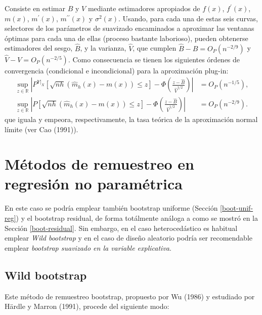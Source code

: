 \documentclass[
]{book}
\theoremstyle{break}
\theoremstyle{nonumberplain}
\begin{document}
Consiste en estimar \(B\) y \(V\) mediante estimadores apropiados de
\(f\left(x \right)\), \(f^{\prime}\left( x \right)\), \(m\left( x \right)\),
\(m^{\prime}\left( x \right)\), \(m^{\prime \prime }\left( x \right)\) y
\(\sigma^2\left( x \right)\). Usando, para cada una de estas seis curvas,
selectores de los parámetros de suavizado encaminados a aproximar las
ventanas óptimas para cada una de ellas (proceso bastante laborioso),
pueden obtenerse estimadores del sesgo, \(\hat{B}\), y la varianza,
\(\hat{V}\), que cumplen \(\hat{B}-B=O_{P}\left( n^{-2/9} \right)\) y
\(\hat{V}-V=O_{P}\left( n^{-2/5} \right)\).
Como consecuencia se tienen los siguientes órdenes de convergencia
(condicional e incondicional) para la aproximación plug-in:
\[\begin{aligned}
\sup_{z\in \mathbb{R}}\left\vert P^{\left. Y\right\vert _{X}}\left[ 
\sqrt{nh}\left( \hat{m}_{h}\left( x \right) -m\left( x \right) \right) \leq z
\right] -\Phi \left( \frac{z-\hat{B}}{\hat{V}^{1/2}} \right) \right\vert
&= O_{P}\left( n^{-1/5} \right), \\
\sup_{z\in \mathbb{R}}\left\vert P\left[ \sqrt{nh}\left( \hat{m}
_{h}\left( x \right) -m\left( x \right) \right) \leq z\right] -\Phi \left( 
\frac{z-\hat{B}}{\hat{V}^{1/2}} \right) \right\vert &= O_{P}\left(
n^{-2/9} \right).
\end{aligned}\]
que iguala y empeora, respectivamente,
la tasa teórica de la aproximación normal límite (ver Cao (1991)).

\section{Métodos de remuestreo en regresión no paramétrica}\label{muxe9todos-de-remuestreo-en-regresiuxf3n-no-paramuxe9trica}

En este caso se podría emplear también bootstrap uniforme (Sección \ref{boot-unif-reg}) y el bootstrap residual, de forma totálmente análoga a como se mostró en la Sección \ref{boot-residual}.
Sin embargo, en el caso heterocedástico es habitual emplear \emph{Wild bootstrap} y en el caso de diseño aleatorio podría ser recomendable emplear \emph{bootstrap suavizado en la variable explicativa}.

\subsection{Wild bootstrap}\label{wild-bootstrap}

Este método de remuestreo bootstrap, propuesto por Wu (1986) y estudiado
por Härdle y Marron (1991), procede del siguiente modo:
\end{document}
